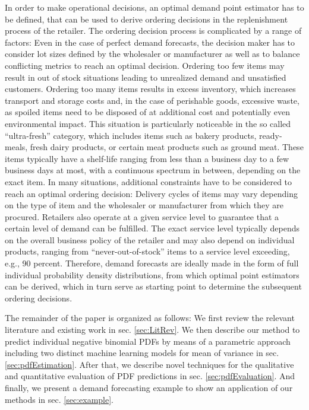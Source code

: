 \documentclass[BCOR=1mm, DIV=calc,10pt,
twoside=true,
twocolumn,
headings=normal]{scrartcl}
\begin{document}
In order to make operational decisions, an optimal demand point estimator has to be defined, that can be used to derive ordering decisions in the replenishment process of the retailer. The ordering decision process is complicated by a range of factors: Even in the case of perfect demand forecasts, the decision maker has to consider lot sizes defined by the wholesaler or manufacturer as well as to balance conflicting metrics to reach an optimal decision. Ordering too few items may result in out of stock situations leading to unrealized demand and unsatisfied customers. Ordering too many items results in excess inventory, which increases transport and storage costs and, in the case of perishable goods, excessive waste, as spoiled items need to be disposed of at additional cost and potentially even environmental impact. This situation is particularly noticeable in the so called ``ultra-fresh'' category, which includes items such as bakery products, ready-meals, fresh dairy products, or certain meat products such as ground meat. These items typically have a shelf-life ranging from less than a business day to a few business days at most, with a continuous spectrum in between, depending on the exact item. In many situations, additional constraints have to be considered to reach an optimal ordering decision: Delivery cycles of items may vary depending on the type of item and the wholesaler or manufacturer from which they are procured. Retailers also operate at a given service level to guarantee that a certain level of demand can be fulfilled. The exact service level typically depends on the overall business policy of the retailer and may also depend on individual products, ranging from ``never-out-of-stock'' items to a service level exceeding, e.g., 90 percent. Therefore, demand forecasts are ideally made in the form of full individual probability density distributions, from which optimal point estimators can be derived, which in turn serve as starting point to determine the subsequent ordering decisions.

The remainder of the paper is organized as follows: We first review the relevant literature and existing work in sec. \ref{sec:LitRev}. We then describe our method to predict individual negative binomial PDFs by means of a parametric approach including two distinct machine learning models for mean of variance in sec. \ref{sec:pdfEstimation}. After that, we describe novel techniques for the qualitative and quantitative evaluation of PDF predictions in sec. \ref{sec:pdfEvaluation}. And finally, we present a demand forecasting example to show an application of our methods in sec. \ref{sec:example}.
\end{document}
